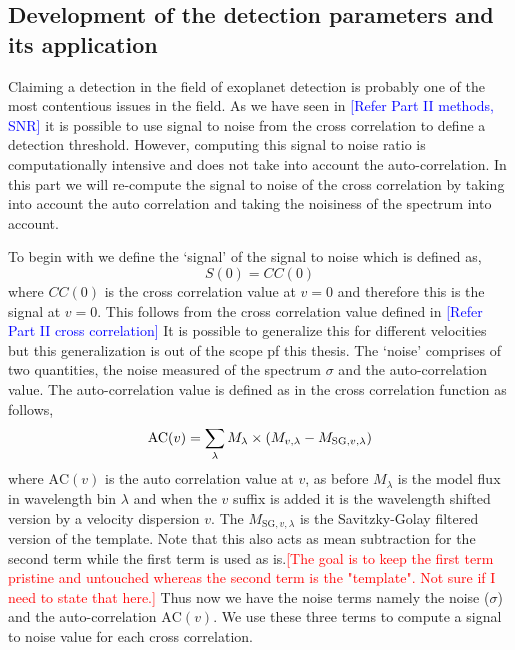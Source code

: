 \subsection{Development of the detection parameters and its application}
Claiming a detection in the field of exoplanet detection is probably one of the most contentious issues in the field.
As we have seen in \textcolor{blue}{[Refer Part II methods, SNR]} it is possible to use signal to noise from the cross correlation to define a detection threshold.
However, computing this signal to noise ratio is computationally intensive and does not take into account the auto-correlation. 
In this part we will re-compute the signal to noise of the cross correlation by taking into account the auto correlation and taking the noisiness of the spectrum into account.

To begin with we define the `signal' of the signal to noise which is defined as,
\begin{equation}
    S(0) = CC(0)
    \label{eq:numerator-snr}
\end{equation}
where $CC(0)$ is the cross correlation value at $v=0$ and therefore this is the signal at $v=0$. 
This follows from the cross correlation value defined in \textcolor{blue}{[Refer Part II cross correlation]}
It is possible to generalize this for different velocities but this generalization is out of the scope pf this thesis.
The `noise'  comprises of two quantities, the noise measured of the spectrum $\sigma$ and the auto-correlation value.
The auto-correlation value is defined as in the cross correlation function as follows,
\begin{equation}
    \textrm{AC}(v) = \sum\limits_{\lambda}M_{\rm{\lambda}}\times (M_{v,\lambda}-M_{\textrm{SG},v,\lambda})  
    \label{eq: AC equation}
\end{equation}
where $\textrm{AC}(v)$ is the auto correlation value at $v$, as before $M_{\lambda}$ is the model flux in wavelength bin $\lambda$ and when the $v$ suffix is added it is the wavelength shifted version by a velocity dispersion $v$.
The $M_{\textrm{SG},v,\lambda}$ is the Savitzky-Golay filtered version of the template.
Note that this also acts as mean subtraction for the second term while the first term is used as is.\textcolor{red}{[The goal is to keep the first term pristine and untouched whereas the second term is the "template". Not sure if I need to state that here.]}
Thus now we have the noise terms namely the noise ($\sigma$) and the auto-correlation $\textrm{AC}(v)$.
We use these three terms to compute a signal to noise value for each cross correlation.
